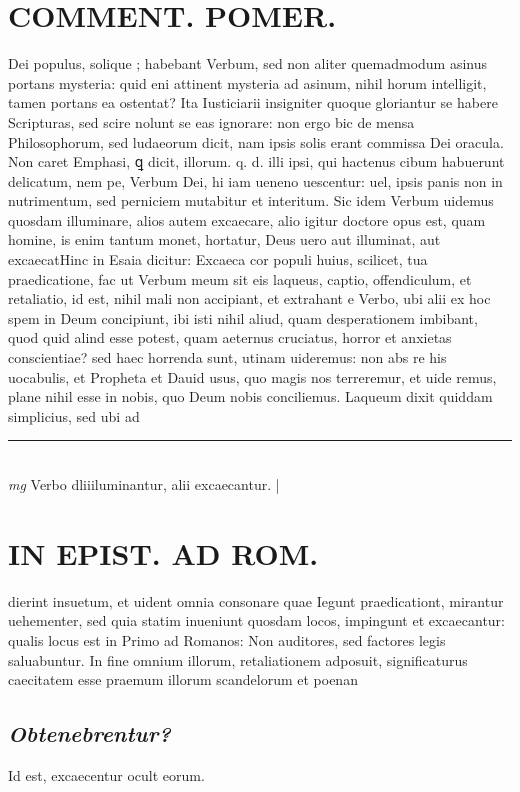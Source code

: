 \documentclass{article}
\begin{document}
\begin{pages}
\section*{COMMENT. POMER.  }\pstart Dei populus, solique ; habebant Verbum, sed non aliter quemadmodum asinus portans mysteria: quid eni attinent mysteria ad asinum, nihil horum intelligit, tamen portans ea ostentat? Ita Iusticiarii insigniter quoque gloriantur se habere Scripturas, sed scire nolunt se eas ignorare: non ergo bic de mensa Philosophorum, sed ludaeorum dicit, nam ipsis solis erant commissa Dei oracula. Non caret Emphasi, ꝗ dicit, illorum. q. d. illi ipsi, qui hactenus cibum habuerunt delicatum, nem pe, Verbum Dei, hi iam ueneno uescentur: uel, ipsis panis non in nutrimentum, sed perniciem mutabitur et interitum. Sic idem Verbum uidemus quosdam illuminare, alios autem excaecare, alio igitur doctore opus est, quam homine, is enim tantum monet, hortatur, Deus uero aut illuminat, aut excaecatHinc in Esaia dicitur: Excaeca cor populi huius, scilicet, tua praedicatione, fac ut Verbum meum sit eis laqueus, captio, offendiculum, et retaliatio, id est, nihil mali non accipiant, et extrahant e Verbo, ubi alii ex hoc spem in Deum concipiunt, ibi isti nihil aliud, quam desperationem imbibant, quod quid alind esse potest, quam aeternus cruciatus, horror et anxietas conscientiae? sed haec horrenda sunt, utinam uideremus: non abs re his uocabulis, et Propheta et Dauid usus, quo magis nos terreremur, et uide remus, plane nihil esse in nobis, quo Deum nobis conciliemus. Laqueum dixit quiddam simplicius, sed ubi ad  \pend
\vspace{0.5cm}\noindent
\vspace{0.2cm}\rule{1cm}{0.2pt}\\ 
\hspace{0.2cm}\textit{mg}
\footnotesize Verbo dliiiluminantur, alii excaecantur.  
\normalsize| 
\section*{IN EPIST. AD ROM.  }
\marginpar{[ p.128 ]}\pstart dierint insuetum, et uident omnia consonare quae Iegunt praedicationt, mirantur uehementer, sed quia statim inueniunt quosdam locos, impingunt et excaecantur: qualis locus est in Primo ad Romanos: Non auditores, sed factores legis saluabuntur. In fine omnium illorum, retaliationem adposuit, significaturus caecitatem esse praemum illorum scandelorum et poenan\pend
{}
{}
\subsection*{\textit{Obtenebrentur? }}\pstart Id est, excaecentur ocult eorum.  \pend
{}
{}

\end{pages}
\end{document}
